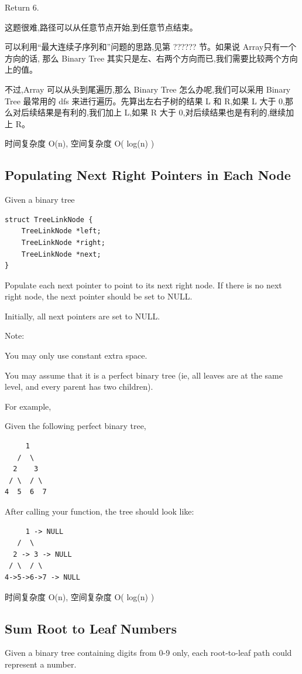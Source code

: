 \documentclass[12pt]{book}
\begin{document}
Return 6.

这题很难,路径可以从任意节点开始,到任意节点结束。

可以利用“最大连续子序列和”问题的思路,见第 ?????? 节。如果说 Array只有一个方向的话, 那么 Binary Tree 其实只是左、右两个方向而已,我们需要比较两个方向上的值。

不过,Array 可以从头到尾遍历,那么 Binary Tree 怎么办呢,我们可以采用 Binary Tree 最常用的 dfs 来进行遍历。先算出左右子树的结果 L 和 R,如果 L 大于 0,那么对后续结果是有利的,我们加上 L,如果 R 大于 0,对后续结果也是有利的,继续加上 R。

时间复杂度 O(n), 空间复杂度 O( log(n) )

\subsection{Populating Next Right Pointers in Each Node}
\label{sec-4-5-6}
Given a binary tree
\lstset{language=java,label= ,caption= ,numbers=none}
\begin{lstlisting}
struct TreeLinkNode {
    TreeLinkNode *left;
    TreeLinkNode *right;
    TreeLinkNode *next;
}
\end{lstlisting}

Populate each next pointer to point to its next right node. If there is no next right node, the next pointer should be set to NULL.

Initially, all next pointers are set to NULL.

Note:

You may only use constant extra space.

You may assume that it is a perfect binary tree (ie, all leaves are at the same level, and every parent has two children).

For example,

Given the following perfect binary tree,
\lstset{language=java,label= ,caption= ,numbers=none}
\begin{lstlisting}
     1
   /  \
  2    3
 / \  / \
4  5  6  7
\end{lstlisting}

After calling your function, the tree should look like:
\lstset{language=java,label= ,caption= ,numbers=none}
\begin{lstlisting}
     1 -> NULL
   /  \
  2 -> 3 -> NULL
 / \  / \
4->5->6->7 -> NULL
\end{lstlisting}

时间复杂度 O(n), 空间复杂度 O( log(n) )


\subsection{Sum Root to Leaf Numbers}
\label{sec-4-5-7}
Given a binary tree containing digits from 0-9 only, each root-to-leaf path could represent a number.
\end{document}

